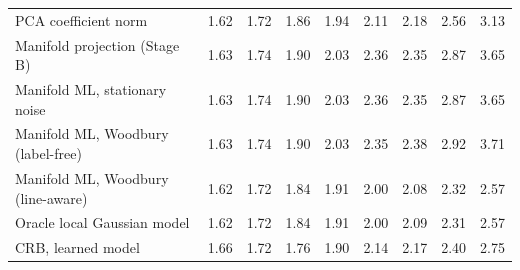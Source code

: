 \begin{tabular}{lrrrrrrrr}
PCA coefficient norm & 1.62 & 1.72 & 1.86 & 1.94 & 2.11 & 2.18 & 2.56 & 3.13 \\
Manifold projection (Stage B) & 1.63 & 1.74 & 1.90 & 2.03 & 2.36 & 2.35 & 2.87 & 3.65 \\
Manifold ML, stationary noise & 1.63 & 1.74 & 1.90 & 2.03 & 2.36 & 2.35 & 2.87 & 3.65 \\
Manifold ML, Woodbury (label-free) & 1.63 & 1.74 & 1.90 & 2.03 & 2.35 & 2.38 & 2.92 & 3.71 \\
Manifold ML, Woodbury (line-aware) & 1.62 & 1.72 & 1.84 & 1.91 & 2.00 & 2.08 & 2.32 & 2.57 \\
Oracle local Gaussian model & 1.62 & 1.72 & 1.84 & 1.91 & 2.00 & 2.09 & 2.31 & 2.57 \\
CRB, learned model & 1.66 & 1.72 & 1.76 & 1.90 & 2.14 & 2.17 & 2.40 & 2.75 \\
\bottomrule
\end{tabular}

